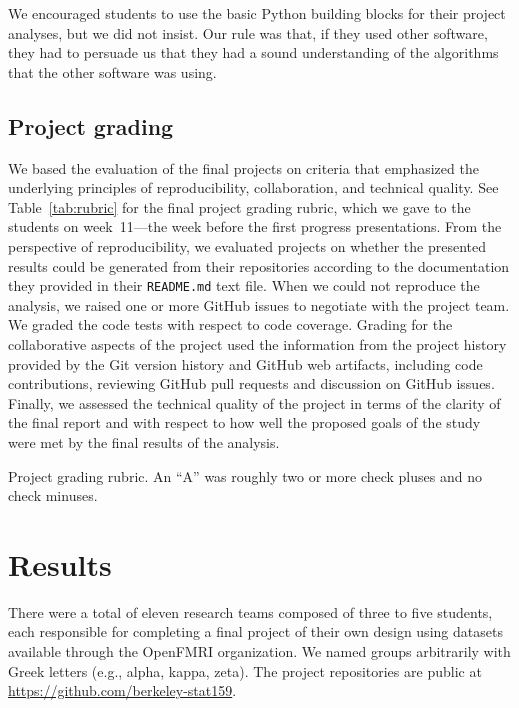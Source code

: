 \begin{itemize}
We encouraged students to use the basic Python building blocks for their
project analyses, but we did not insist.  Our rule was that, if they used
other software, they had to persuade us that they had a sound understanding of
the algorithms that the other software was using.


\end{itemize}

\subsection{Project grading}

We based the evaluation of the final projects on criteria that emphasized the
underlying principles of reproducibility, collaboration, and technical
quality.
See Table~\ref{tab:rubric} for the final project grading rubric, which we
gave to the students on week~11---the week before the first progress
presentations.
From the perspective of reproducibility, we evaluated projects on whether the
presented results could be generated from their repositories according to the
documentation they provided in their \texttt{README.md} text file.  When we
could not reproduce the analysis, we raised one or more GitHub issues to
negotiate with the project team.
We graded the code tests with respect to code coverage.
Grading for the collaborative aspects of the project used the information
from the project history provided by the Git version history and GitHub web
artifacts, including code contributions, reviewing GitHub pull requests and
discussion on GitHub issues.
Finally, we assessed the technical quality of the project in terms of
the clarity of the final report and with respect to how well the proposed
goals of the study were met by the final results of the analysis.

\begin{table}
\centering
\begin{tiny}

\caption{Project grading rubric.
An ``A'' was roughly two or more check pluses and no check minuses.}
\label{tab:rubric}
\end{tiny}
\end{table}

\section{Results}\label{results}

There were a total of eleven research teams composed of three to five
students, each responsible for completing a final project of their own design
using datasets available through the OpenFMRI organization.  We named groups
arbitrarily with Greek letters (e.g., alpha, kappa, zeta).  The project
repositories are public at \url{https://github.com/berkeley-stat159}.

